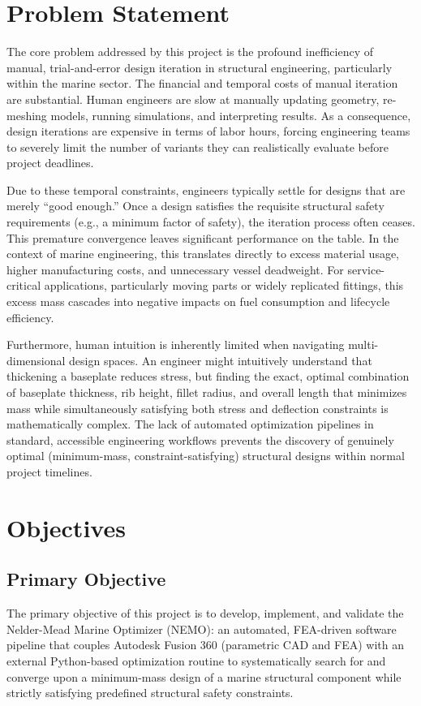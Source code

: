 \section{Problem Statement}
The core problem addressed by this project is the profound inefficiency of manual, trial-and-error design iteration in structural engineering, particularly within the marine sector. The financial and temporal costs of manual iteration are substantial. Human engineers are slow at manually updating geometry, re-meshing models, running simulations, and interpreting results. As a consequence, design iterations are expensive in terms of labor hours, forcing engineering teams to severely limit the number of variants they can realistically evaluate before project deadlines. 

Due to these temporal constraints, engineers typically settle for designs that are merely ``good enough.'' Once a design satisfies the requisite structural safety requirements (e.g., a minimum factor of safety), the iteration process often ceases. This premature convergence leaves significant performance on the table. In the context of marine engineering, this translates directly to excess material usage, higher manufacturing costs, and unnecessary vessel deadweight. For service-critical applications, particularly moving parts or widely replicated fittings, this excess mass cascades into negative impacts on fuel consumption and lifecycle efficiency. 

Furthermore, human intuition is inherently limited when navigating multi-dimensional design spaces. An engineer might intuitively understand that thickening a baseplate reduces stress, but finding the exact, optimal combination of baseplate thickness, rib height, fillet radius, and overall length that minimizes mass while simultaneously satisfying both stress and deflection constraints is mathematically complex. The lack of automated optimization pipelines in standard, accessible engineering workflows prevents the discovery of genuinely optimal (minimum-mass, constraint-satisfying) structural designs within normal project timelines. 

\section{Objectives}

\subsection{Primary Objective}
The primary objective of this project is to develop, implement, and validate the Nelder-Mead Marine Optimizer (NEMO): an automated, FEA-driven software pipeline that couples Autodesk Fusion 360 (parametric CAD and FEA) with an external Python-based optimization routine to systematically search for and converge upon a minimum-mass design of a marine structural component while strictly satisfying predefined structural safety constraints.

